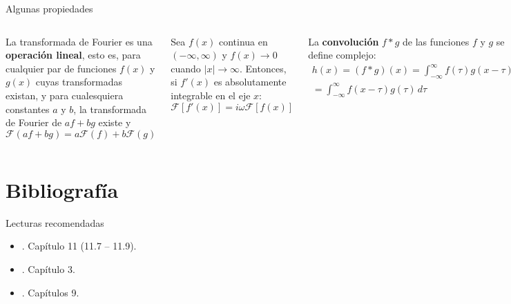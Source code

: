 \documentclass[9pt, aspectratio=169]{beamer}
\begin{document}
\begin{frame}{Algunas propiedades}
\begin{columns}[c]
\cx
\begin{theorem}
    La transformada de Fourier es una \textbf{operación lineal}, esto es, para cualquier par de funciones $f(x)$ y $g(x)$ cuyas transformadas existan, y para cualesquiera constantes $a$ y $b$, la transformada de Fourier de $af + bg$ existe y
    \[ \mathscr{F}(a f + b g) = a \mathscr{F}(f) +  b \mathscr{F}(g) \]
\end{theorem} \pause

\begin{theorem}
Sea $f(x)$ continua en $(-\infty, \infty)$ y $f(x) \rightarrow 0$ cuando $|x| \rightarrow \infty$. Entonces, si $f'(x)$ es absolutamente integrable en el eje $x$:
\[ \mathscr{F}[ f'(x)] = i \omega \mathscr{F}[f(x)]  \]
\end{theorem}
\pause 

\cx
La \textbf{convolución} $f * g$ de las funciones $f$ y $g$ se define complejo:
\begin{multline*}
    h(x) = (f * g)(x) = \int_{-\infty}^{\infty} f(\tau) g(x - \tau) \, d\tau \\
= \int_{-\infty}^{\infty} f(x - \tau) g(\tau) \, d\tau 
\end{multline*}
\pause 

\begin{theorem}[Convolución]
Sean $f(x)$ y $g(x)$ funciones acotadas, continuas por tramos, y absolutamente integrables en $(-\infty, \infty)$, entonces
\[ \mathscr{F}(f * g) = \sqrt{2 \pi} \mathscr{F}(f) \mathscr{F}(g) \]
\end{theorem}

\end{columns}
\end{frame}


\section*{Bibliografía}
\begin{frame}[allowframebreaks]{Lecturas recomendadas}
\begin{itemize}
 \item {}. Capítulo 11 (11.7 -- 11.9).
 \item {}. Capítulo 3.
 \item {}. Capítulos 9.
\end{itemize}
\end{frame}
\end{document}

